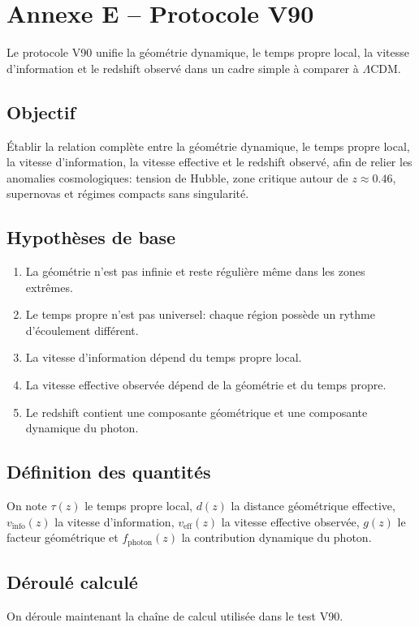 \section{Annexe E -- Protocole V90}
Le protocole V90 unifie la géométrie dynamique, le temps propre local, la vitesse d'information et le redshift observé dans un cadre simple à comparer à $\Lambda$CDM.

\subsection{Objectif}
Établir la relation complète entre la géométrie dynamique, le temps propre local, la vitesse d'information, la vitesse effective et le redshift observé, afin de relier les anomalies cosmologiques: tension de Hubble, zone critique autour de $z\approx0.46$, supernovas et régimes compacts sans singularité.

\subsection{Hypothèses de base}
\begin{enumerate}
    \item La géométrie n'est pas infinie et reste régulière même dans les zones extrêmes.
    \item Le temps propre n'est pas universel: chaque région possède un rythme d'écoulement différent.
    \item La vitesse d'information dépend du temps propre local.
    \item La vitesse effective observée dépend de la géométrie et du temps propre.
    \item Le redshift contient une composante géométrique et une composante dynamique du photon.
\end{enumerate}

\subsection{Définition des quantités}
On note $\tau(z)$ le temps propre local, $d(z)$ la distance géométrique effective, $v_{\mathrm{info}}(z)$ la vitesse d'information, $v_{\mathrm{eff}}(z)$ la vitesse effective observée, $g(z)$ le facteur géométrique et $f_{\mathrm{photon}}(z)$ la contribution dynamique du photon.

\subsection{Déroulé calculé}
On déroule maintenant la chaîne de calcul utilisée dans le test V90.

